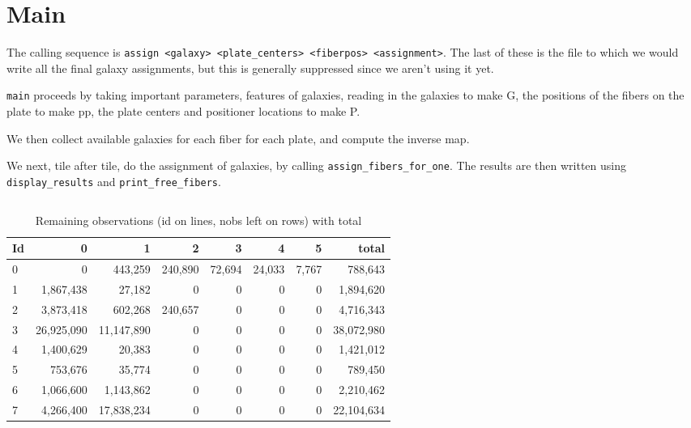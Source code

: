 \documentclass{article}
\begin{document}
\section{Main}

 The calling sequence is {\tt assign  <galaxy> <plate\_centers> <fiberpos> <assignment>}.  The last of these is the file to which we would write all the final galaxy assignments, but this is generally suppressed since we aren't using it yet.
 
 {\tt main} proceeds by taking important parameters, features of galaxies, reading in the galaxies to make G, the positions of the fibers on the plate to make pp, the plate centers and positioner locations to make P. 
 

We then collect available galaxies for each fiber for each plate, and compute the inverse map.
 
 We next, tile after tile, do the assignment of galaxies, by calling {\tt assign\_fibers\_for\_one}. The results are then written using {\tt display\_results} and {\tt print\_free\_fibers}.
 
 \begin{verbatim}

\end{verbatim}
 
 
\begin{table}[h]\begin{center}
\caption{Remaining observations (id on lines, nobs left on rows) with total}\label{tab:full14k}
\begin{tabular}{l|rrrrrrr}
	Id &      0  &           1  &           2  &           3  &           4  &           5  & total\\ \hline
   0  &           0  &     443,259  &     240,890  &      72,694  &      24,033  &       7,767  &     788,643\\
   1  &   1,867,438  &      27,182  &           0  &           0  &           0  &           0  &   1,894,620\\
   2  &   3,873,418  &     602,268  &     240,657  &           0  &           0  &           0  &   4,716,343\\
   3  &  26,925,090  &  11,147,890  &           0  &           0  &           0  &           0  &  38,072,980\\
   4  &   1,400,629  &      20,383  &           0  &           0  &           0  &           0  &   1,421,012\\
   5  &     753,676  &      35,774  &           0  &           0  &           0  &           0  &     789,450\\
   6  &   1,066,600  &   1,143,862  &           0  &           0  &           0  &           0  &   2,210,462\\
   7  &   4,266,400  &  17,838,234  &           0  &           0  &           0  &           0  &  22,104,634\\
\end{tabular}\end{center}
 \end{table}
\end{document}
